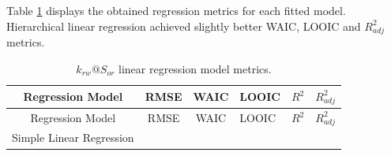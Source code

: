 \documentclass[english,msc,numbers]{coppe}
\begin{document}
  Table \ref{tab:krw-regression-metrics} displays the obtained regression metrics for each fitted model. Hierarchical linear regression achieved slightly better WAIC, LOOIC and \(R_{adj}^2\) metrics.
  \begin{longtable}[]{@{}ccclll@{}}
  \caption{\label{tab:krw-regression-metrics} \(k_{rw}@S_{or}\) linear regression model metrics.}\tabularnewline
  \toprule
  \begin{minipage}[b]{0.36\columnwidth}\centering
  Regression Model\strut
  \end{minipage} & \begin{minipage}[b]{0.08\columnwidth}\centering
  RMSE\strut
  \end{minipage} & \begin{minipage}[b]{0.11\columnwidth}\centering
  WAIC\strut
  \end{minipage} & \begin{minipage}[b]{0.09\columnwidth}\raggedright
  LOOIC\strut
  \end{minipage} & \begin{minipage}[b]{0.06\columnwidth}\raggedright
  \(R^2\)\strut
  \end{minipage} & \begin{minipage}[b]{0.13\columnwidth}\raggedright
  \(R_{adj}^2\)\strut
  \end{minipage}\tabularnewline
  \midrule
  \endfirsthead
  \toprule
  \begin{minipage}[b]{0.36\columnwidth}\centering
  Regression Model\strut
  \end{minipage} & \begin{minipage}[b]{0.08\columnwidth}\centering
  RMSE\strut
  \end{minipage} & \begin{minipage}[b]{0.11\columnwidth}\centering
  WAIC\strut
  \end{minipage} & \begin{minipage}[b]{0.09\columnwidth}\raggedright
  LOOIC\strut
  \end{minipage} & \begin{minipage}[b]{0.06\columnwidth}\raggedright
  \(R^2\)\strut
  \end{minipage} & \begin{minipage}[b]{0.13\columnwidth}\raggedright
  \(R_{adj}^2\)\strut
  \end{minipage}\tabularnewline
  \midrule
  \endhead
  \begin{minipage}[t]{0.36\columnwidth}\centering
  Simple Linear Regression\strut
  \end{minipage} & \begin{minipage}[t]{0.08\columnwidth}\centering

\end{minipage}
\end{longtable}
\end{document}
